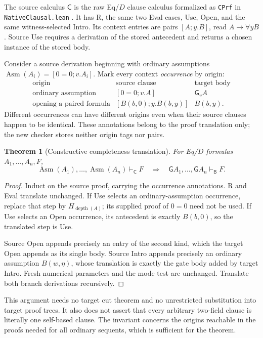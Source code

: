 \documentclass[11pt]{article}
\newtheorem{theorem}{Theorem}[section]
\theoremstyle{definition}
\theoremstyle{remark}
\newcommand{\Bprf}{\mathsf{B}}
\newcommand{\Cprf}{\mathsf{C}}
\newcommand{\gate}{\mathsf{G}}
\newcommand{\depth}{\operatorname{depth}}
\newcommand{\asm}{\operatorname{Asm}}
\newcommand{\entB}{\vdash_{\Bprf}}
\newcommand{\entC}{\vdash_{\Cprf}}
\begin{document}
The source calculus $\Cprf$ is the raw Eq/$D$ clause calculus formalized
as \texttt{CPrf} in \texttt{NativeClausal.lean} \cite{clausal}. It has
R, the same two Eval cases, Use, Open, and the same witness-selected
Intro. Its context entries are pairs $[A;y.B]$, read
$A\to\forall yB$. Source Use requires a derivation of the stored
antecedent and returns a chosen instance of the stored body.

Consider a source derivation beginning with ordinary assumptions
$\asm(A_i)=[0=0;v.A_i]$. Mark every context \emph{occurrence} by origin:
\[
 \begin{array}{c|c|c}
 \text{origin}&\text{source clause}&\text{target body}\\\hline
 \text{ordinary assumption}&[0=0;v.A]&\gate_v A\\
 \text{opening a paired formula}&[B(b,0);y.B(b,y)]&B(b,y).
 \end{array}
\]
Different occurrences can have different origins even when their source
clauses happen to be identical. These annotations belong to the proof
translation only; the new checker stores neither origin tags nor pairs.

\begin{theorem}[Constructive completeness translation]
For Eq/$D$ formulas $A_1,\ldots,A_n,F$,
\[
 \asm(A_1),\ldots,\asm(A_n)\entC F
 \quad\Longrightarrow\quad
 \gate A_1,\ldots,\gate A_n\entB F.
 \tag{C-to-B}
\]
\end{theorem}
\begin{proof}
Induct on the source proof, carrying the occurrence annotations.
R and Eval translate unchanged. If Use selects an ordinary-assumption
occurrence, replace that step by $H_{\depth(A)}$; its supplied proof of
$0=0$ need not be used. If Use selects an Open occurrence, its antecedent
is exactly $B(b,0)$, so the translated step is Use.

Source Open appends precisely an entry of the second kind, which the
target Open appends as its single body. Source Intro appends precisely
an ordinary assumption $B(w,\eta)$, whose translation is exactly the
gate body added by target Intro. Fresh numerical parameters and the
mode test are unchanged. Translate both branch derivations recursively.
\end{proof}

This argument needs no target cut theorem and no unrestricted
substitution into target proof trees. It also does not assert that every
arbitrary two-field clause is literally one self-based clause. The
invariant concerns the origins reachable in the proofs needed for all
ordinary sequents, which is sufficient for the theorem.
\end{document}
